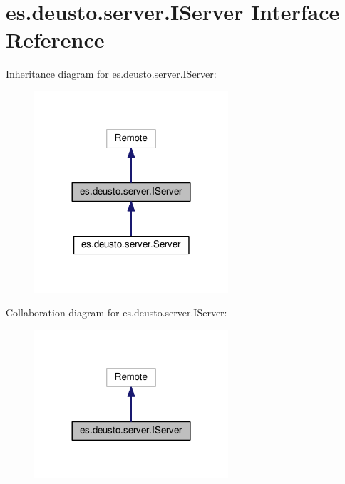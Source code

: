 \hypertarget{interfacees_1_1deusto_1_1server_1_1_i_server}{}\section{es.\+deusto.\+server.\+I\+Server Interface Reference}
\label{interfacees_1_1deusto_1_1server_1_1_i_server}


Inheritance diagram for es.\+deusto.\+server.\+I\+Server\+:
\nopagebreak
\begin{figure}[H]
\begin{center}
\leavevmode
\includegraphics[width=204pt]{interfacees_1_1deusto_1_1server_1_1_i_server__inherit__graph}
\end{center}
\end{figure}


Collaboration diagram for es.\+deusto.\+server.\+I\+Server\+:
\nopagebreak
\begin{figure}[H]
\begin{center}
\leavevmode
\includegraphics[width=204pt]{interfacees_1_1deusto_1_1server_1_1_i_server__coll__graph}
\end{center}
\end{figure}
